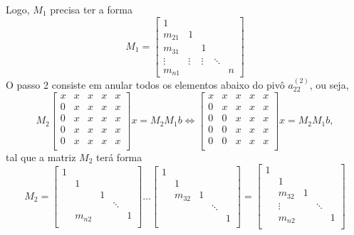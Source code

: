 \documentclass[../numerical_methods.tex]{subfiles}
\begin{document}
Logo, \(M_{1}\) precisa ter a forma
\[
	M_{1} = \begin{bmatrix}
		1      &        &        &        &   \\
		m_{21} & 1      &        &        &   \\
		m_{31} &        & 1      &        &   \\
		\vdots & \vdots & \vdots & \ddots &   \\
		m_{n1} &        &        &        & n
	\end{bmatrix}
\]
O passo 2 consiste em anular todos os elementos abaixo do pivô \(a_{22}^{(2)}\), ou seja,
\[
	M_{2}\begin{bmatrix}
		x & x & x & x & x \\
		0 & x & x & x & x \\
		0 & x & x & x & x \\
		0 & x & x & x & x \\
		0 & x & x & x & x \\
	\end{bmatrix}x = M_{2}M_{1}b \Leftrightarrow \begin{bmatrix}
		x & x & x & x & x \\
		0 & x & x & x & x \\
		0 & 0 & x & x & x \\
		0 & 0 & x & x & x \\
		0 & 0 & x & x & x \\
	\end{bmatrix}x = M_{2}M_{1}b,
\]
tal que a matriz \(M_{2}\) terá forma
\[
	M_{2} = \begin{bmatrix}
		1 &        &   &        &   \\
		  & 1      &   &        &   \\
		  &        & 1 &        &   \\
		  &        &   & \ddots &   \\
		  & m_{n2} &   &        & 1 \\
	\end{bmatrix}\dotsc \begin{bmatrix}
		1 &        &   &        &   \\
		  & 1      &   &        &   \\
		  & m_{32} & 1 &        &   \\
		  &        &   & \ddots &   \\
		  &        &   &        & 1 \\
	\end{bmatrix} =\begin{bmatrix}
		1 &        &   &        &   \\
		  & 1      &   &        &   \\
		  & m_{32} & 1 &        &   \\
		  & \vdots &   & \ddots &   \\
		  & m_{n2} &   &        & 1 \\
	\end{bmatrix}
\]
\end{document}
